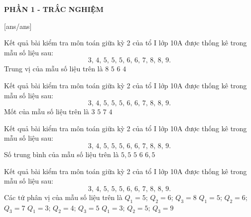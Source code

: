 
\begin{center}
	\textbf{PHẦN 1 - TRẮC NGHIỆM}
\end{center}
[ans/ans]
\begin{ex}%
Kết quả bài kiểm tra môn toán giữa kỳ 2 của tổ I lớp 10A được thống kê trong mẫu số liệu sau:
\[3,\,4,\,5,\,5,\,5,\,6,\,6,\,7,\,8,\,8,\,9.\]
Trung vị của mẫu số liệu trên là
\choice
{$8$}
{$5$}
{\True $6$}
{$4$}
\end{ex}
\begin{ex}%
Kết quả bài kiểm tra môn toán giữa kỳ 2 của tổ I lớp 10A được thống kê trong mẫu số liệu sau:
\[3,\,4,\,5,\,5,\,5,\,6,\,6,\,7,\,8,\,8,\,9.\]
Mốt của mẫu số liệu trên là
\choice
{$3$}
{\True $5$}
{$7$}
{$4$}
\end{ex}
\begin{ex}%
Kết quả bài kiểm tra môn toán giữa kỳ 2 của tổ I lớp 10A được thống kê trong mẫu số liệu sau:
\[3,\,4,\,5,\,5,\,5,\,6,\,6,\,7,\,8,\,8,\,9.\]
Số trung bình của mẫu số liệu trên là
\choice
{$5{,}5$}
{$5$}
{\True $6$}
{$6{,}5$}
\end{ex}
\begin{ex}%
Kết quả bài kiểm tra môn toán giữa kỳ 2 của tổ I lớp 10A được thống kê trong mẫu số liệu sau:
\[3,\,4,\,5,\,5,\,5,\,6,\,6,\,7,\,8,\,8,\,9.\]
Các tứ phân vị của mẫu số liệu trên là
\choice
{\True $Q_1=5 $; $Q_2=6 $; $Q_3=8$}
{$Q_1=5 $; $Q_2=6 $; $Q_3=7$}
{$Q_1=3 $; $Q_2=4 $; $Q_3=5$}
{$Q_1=3 $; $Q_2=5 $; $Q_3=9$}
\end{ex}
